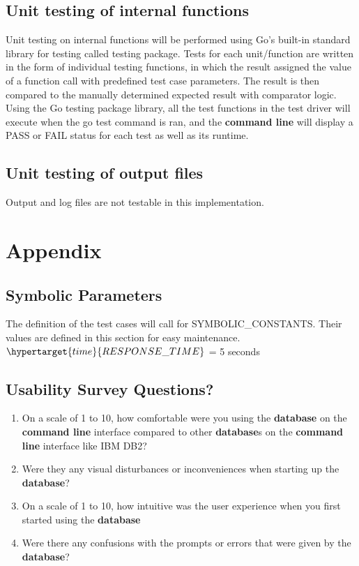 \documentclass[12pt, titlepage]{article}
\begin{document}
\subsection{Unit testing of internal functions}
Unit testing on internal functions will be performed using Go's built-in standard library for testing called testing package. Tests for each unit/function are written in the form of individual testing functions, in which the result assigned the value of a function call with predefined test case parameters. The result is then compared to the manually determined expected result with comparator logic. Using the Go testing package library, all the test functions in the test driver will execute when the go test command is ran, and the \textbf{command line} will display a PASS or FAIL status for each test as well as its runtime.
		
\subsection{Unit testing of output files}	
Output and log files are not testable in this implementation.





\newpage

\section{Appendix}

\subsection{Symbolic Parameters}

The definition of the test cases will call for SYMBOLIC\_CONSTANTS.
Their values are defined in this section for easy maintenance.\\

\noindent $\hypertarget{time}{RESPONSE\_TIME}$ = 5 seconds

\subsection{Usability Survey Questions?}

\begin{enumerate}
    \item On a scale of 1 to 10, how comfortable were you using the \textbf{database} on the \textbf{command line} interface compared to other \textbf{database}s on the \textbf{command line} interface like IBM DB2?
    
    \item Were they any visual disturbances or inconveniences when starting up the \textbf{database}? 
    
    \item On a scale of 1 to 10, how intuitive was the user experience when you first started using the \textbf{database}
    
    \item Were there any confusions with the prompts or errors that were given by the \textbf{database}?
    
\end{enumerate}
\end{document}
